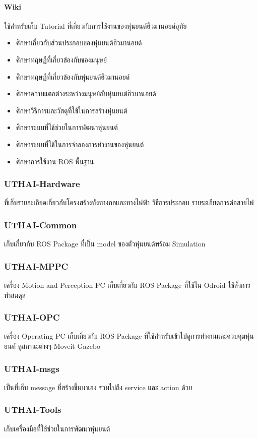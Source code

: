 \paragraph*{Wiki}
ใช้สำหรับเก็บ Tutorial ที่เกี่ยวกับการใช้งานของหุ่นยนต์ฮิวมานอยด์อุทัย

\begin{itemize}\setlength\itemsep{-0.3em}
	\item ศึกษาเกี่ยวกับส่วนประกอบของหุ่นยนต์ฮิวมานอยด์
	\item ศึกษาทฤษฏีที่เกี่ยวข้องกับของมนุษย์
	\item ศึกษาทฤษฏีที่เกี่ยวข้องกับหุ่นยนต์ฮิวมานอยด์
	\item ศึกษาความแตกต่างระหว่างมนุษย์กับหุ่นยนต์ฮิวมานอยด์
	\item ศึกษาวิธีการและวัสดุที่ใช้ในการสร้างหุ่นยนต์
	\item ศึกษาระบบที่ใช้ช่วยในการพัฒนาหุ่นยนต์
	\item ศึกษาระบบที่ใช้ในการจำลองการทำงานของหุ่นยนต์
	\item ศึกษาการใช้งาน ROS พื้นฐาน
\end{itemize}



\subsubsection*{UTHAI-Hardware}
ที่เก็บรายละเอียดเกี่ยวกับโครงสร้างทั้งทางกลและทางไฟฟ้า วิธีการประกอบ รายระเอียดการต่อสายไฟ

\subsubsection*{UTHAI-Common}
เก็บเกี่ยวกับ ROS Package ที่เป็น model ของตัวหุ่นยนต์พร้อม Simulation

\subsubsection*{UTHAI-MPPC}
เครื่อง Motion and Perception PC
เก็บเกี่ยวกับ ROS Package ที่ใช้ใน Odroid ใช้สั่งการ ทำสมดุล

\subsubsection*{UTHAI-OPC}
เครื่อง Operating PC
เก็บเกี่ยวกับ ROS Package ที่ใช้สำหรับเข้าไปดูการทำงานและควบคุมหุ่นยนต์ ดูสถานะต่างๆ Moveit Gazebo

\subsubsection*{UTHAI-msgs}
เป็นที่เก็บ message ที่สร้างขึ้นมาเอง รวมไปถึง service และ action ด้วย

\subsubsection*{UTHAI-Tools}
เก็บเครื่องมือที่ใช้ช่วยในการพัฒนาหุ่นยนต์

